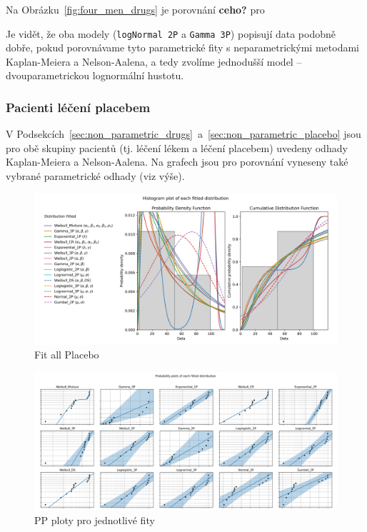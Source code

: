 \documentclass[a4, 11pt]{article}
\newcommand{\commm}[1]{{\textcolor[cmyk]{0,1,0,0}{\textbf{\textsf{#1}}}}}      %
\theoremstyle{definition}
\theoremstyle{remark}
\begin{document}
	Na Obrázku~\ref{fig:four_men_drugs} je porovnání \commm{ceho?} pro
	
	Je vidět, že oba modely (\texttt{logNormal 2P} a \texttt{Gamma 3P}) popisují data podobně dobře, pokud porovnávame tyto parametrické fity s neparametrickými metodami Kaplan-Meiera a Nelson-Aalena, a tedy zvolíme jednodušší model -- dvouparametrickou lognormální hustotu.
	
	
	
	\subsubsection{Pacienti léčení placebem} \label{sec:parametric_placebo}
	V Podsekcích~\ref{sec:non_parametric_drugs}~a~\ref{sec:non_parametric_placebo} jsou pro obě skupiny pacientů (tj. léčení lékem a léčení placebem) uvedeny odhady Kaplan-Meiera a Nelson-Aalena.
	Na grafech jsou pro porovnání vyneseny také vybrané parametrické odhady (viz výše).
	
	
	\begin{figure}[H]
		\centering
		\includegraphics[width=0.8\linewidth]{img/fiteverything_placebo_histogram.png}
		\caption{Fit all Placebo}
		\label{fig:fit_everything_hist_placebo}
	\end{figure}

	\begin{figure}[H]
		\centering
		\includegraphics[width=0.9\linewidth]{img/fiteverything_placebo_PP_plots.png}
		\caption{PP ploty pro jednotlivé fity}
		\label{fig:fit_everything_placebo_PP_plots}
	\end{figure}
	
\end{document}
